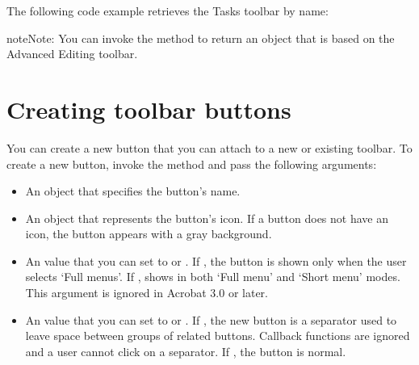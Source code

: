 \documentclass[letterpaper,12pt,english,openany,oneside]{sphinxmanual}
\begin{document}
The following code example retrieves the Tasks toolbar by name:

\begin{sphinxVerbatim}[commandchars=\\\{\}]
   
     
   
\end{sphinxVerbatim}

\begin{sphinxadmonition}{note}{Note:}
You can invoke the  method to return an  object that is based on the Advanced Editing toolbar.
\end{sphinxadmonition}


\section{Creating toolbar buttons}
\label{\detokenize{Plugins_Toolbutton:creating-toolbar-buttons}}
You can create a new button that you can attach to a new or existing toolbar. To create a new button, invoke the  method and pass the following arguments:
\begin{itemize}
\item {} 
An  object that specifies the button’s name.

\item {} 
An  object that represents the button’s icon. If a button does not have an icon, the button appears with a gray background.

\item {} 
An  value that you can set to  or . If , the button is shown only when the user selects ‘Full menus’. If , shows in both ‘Full menu’ and ‘Short menu’ modes. This argument is ignored in Acrobat 3.0 or later.

\item {} 
An  value that you can set to  or . If , the new button is a separator used to leave space between groups of related buttons. Callback functions are ignored and a user cannot click on a separator. If , the button is normal.

\end{itemize}
\end{document}
